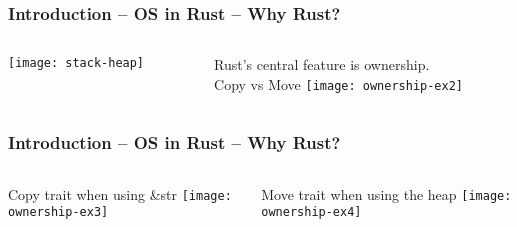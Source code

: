 \begin{frame}[plain]
	\frametitle{Introduction -- OS in Rust -- Why Rust?}
	
	
	
	\begin{columns}
		
		\begin{column}{.3\textwidth}
			
			\texttt{[image: stack-heap]}
			
		\end{column}
		
		\begin{column}{.7\textwidth}
			
			\Large
			
			Rust's central feature is ownership. 
			\\ 
			Copy vs Move
			\texttt{[image: ownership-ex2]}
			
		\end{column}
		
		
	\end{columns}
	
	
\end{frame}



\begin{frame}[plain]
	\frametitle{Introduction -- OS in Rust -- Why Rust?}
	
	
	
	\begin{columns}
		
		\begin{column}{.5\textwidth}
			\Large
			Copy trait when using \&str 
			\texttt{[image: ownership-ex3]}
			
		\end{column}
		
		\begin{column}{.5\textwidth}
			
			\Large
			

			Move trait when using the heap
			\texttt{[image: ownership-ex4]}
			
		\end{column}
		
		
	\end{columns}
	
	
\end{frame}


